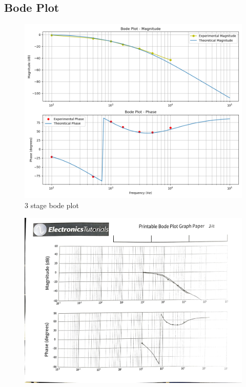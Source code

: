 \documentclass[12pt,a4paper]{report}
\begin{document}
\subsection{Bode Plot}
\begin{figure}[H] %
    \centering
    \includegraphics[width=\textwidth]{figs/3phase.png} %
    
    \caption{3 stage bode plot}
    \label{fig:bode plot}
\end{figure}
\begin{figure}
    \centering
    \includegraphics[width=\linewidth]{figs/3draw.jpg}
    
    \label{fig:enter-label}
\end{figure}
\end{document}
